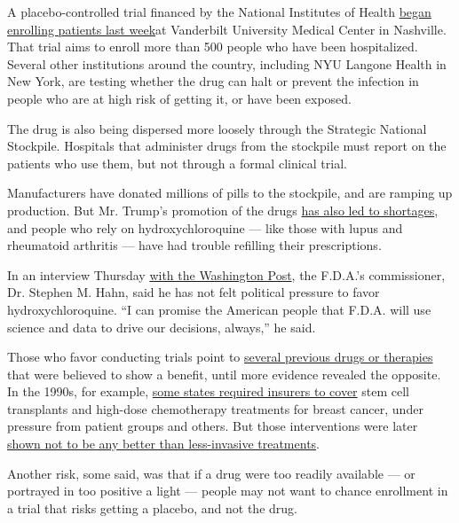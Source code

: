 A placebo-controlled trial financed by the National Institutes of Health
\href{https://www.nih.gov/news-events/news-releases/nih-clinical-trial-hydroxychloroquine-potential-therapy-covid-19-begins}{began
enrolling patients last week}at Vanderbilt University Medical Center in
Nashville. That trial aims to enroll more than 500 people who have been
hospitalized. Several other institutions around the country, including
NYU Langone Health in New York, are testing whether the drug can halt or
prevent the infection in people who are at high risk of getting it, or
have been exposed.

The drug is also being dispersed more loosely through the Strategic
National Stockpile. Hospitals that administer drugs from the stockpile
must report on the patients who use them, but not through a formal
clinical trial.

Manufacturers have donated millions of pills to the stockpile, and are
ramping up production. But Mr. Trump's promotion of the drugs
\href{https://www.nytimes3xbfgragh.onion/2020/03/20/health/coronavirus-chloroquine-trump.html}{has
also led to shortages}, and people who rely on hydroxychloroquine ---
like those with lupus and rheumatoid arthritis --- have had trouble
refilling their prescriptions.

In an interview Thursday
\href{https://www.washingtonpost.com/washington-post-live/2020/04/16/transcript-confronting-covid-19/}{with
the Washington Post}, the F.D.A.'s commissioner, Dr. Stephen M. Hahn,
said he has not felt political pressure to favor hydroxychloroquine. ``I
can promise the American people that F.D.A. will use science and data to
drive our decisions, always,'' he said.

Those who favor conducting trials point to
\href{https://www.bloomberg.com/news/articles/2019-05-30/too-many-medicines-simply-don-t-work}{several
previous drugs or therapies} that were believed to show a benefit, until
more evidence revealed the opposite. In the 1990s, for example,
\href{https://www.cancernetwork.com/breast-cancer/health-insurance-coverage-autologous-bone-marrow-transplantation-breast-cancer}{some
states required insurers to cover} stem cell transplants and high-dose
chemotherapy treatments for breast cancer, under pressure from patient
groups and others. But those interventions were later
\href{https://www.ncbi.nlm.nih.gov/pmc/articles/PMC3393031/}{shown not
to be any better than less-invasive treatments}.

Another risk, some said, was that if a drug were too readily available
--- or portrayed in too positive a light --- people may not want to
chance enrollment in a trial that risks getting a placebo, and not the
drug.


